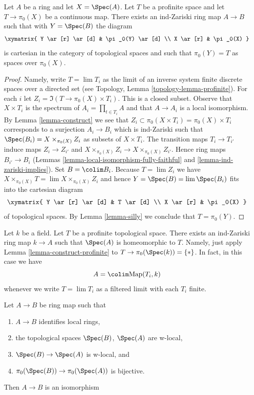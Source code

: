 \begin{lemma}
\label{lemma-construct-profinite}
Let $A$ be a ring and let $X = \Spec(A)$. Let $T$ be a profinite space and
let $T \to \pi_0(X)$ be a continuous map. There exists an
ind-Zariski ring map $A \to B$ such that with $Y = \Spec(B)$ the diagram
$$
\xymatrix{
Y \ar[r] \ar[d] & \pi_0(Y) \ar[d] \\
X \ar[r] & \pi_0(X)
}
$$
is cartesian in the category of topological spaces and such that
$\pi_0(Y) = T$ as spaces over $\pi_0(X)$.
\end{lemma}

\begin{proof}
Namely, write $T = \lim T_i$ as the limit of an inverse system finite
discrete spaces over a directed set (see
Topology, Lemma \ref{topology-lemma-profinite}). For each $i$ let
$Z_i = \Im(T \to \pi_0(X) \times T_i)$. This is a closed subset.
Observe that $X \times T_i$ is the spectrum of $A_i = \prod_{t \in T_i} A$
and that $A \to A_i$ is a local isomorphism. By Lemma \ref{lemma-construct}
we see that $Z_i \subset \pi_0(X \times T_i) = \pi_0(X) \times T_i$
corresponds to a surjection $A_i \to B_i$ which is ind-Zariski
such that $\Spec(B_i) = X \times_{\pi_0(X)} Z_i$ as subsets of
$X \times T_i$. The transition maps $T_i \to T_{i'}$ induce maps
$Z_i \to Z_{i'}$ and $X \times_{\pi_0(X)} Z_i \to X \times_{\pi_0(X)} Z_{i'}$.
Hence ring maps $B_{i'} \to B_i$
(Lemmas \ref{lemma-local-isomorphism-fully-faithful} and
\ref{lemma-ind-zariski-implies}).
Set $B = \colim B_i$. Because $T = \lim Z_i$ we have
$X \times_{\pi_0(X)} T = \lim  X \times_{\pi_0(X)} Z_i$
and hence $Y = \Spec(B) = \lim \Spec(B_i)$
fits into the cartesian diagram
$$
\xymatrix{
Y \ar[r] \ar[d] & T \ar[d] \\
X \ar[r] & \pi_0(X)
}
$$
of topological spaces. By Lemma \ref{lemma-silly}
we conclude that $T = \pi_0(Y)$.
\end{proof}

\begin{example}
\label{example-construct-space}
Let $k$ be a field. Let $T$ be a profinite topological space.
There exists an ind-Zariski ring map $k \to A$ such that
$\Spec(A)$ is homeomorphic to $T$. Namely, just apply
Lemma \ref{lemma-construct-profinite} to $T \to \pi_0(\Spec(k)) = \{*\}$.
In fact, in this case we have
$$
A = \colim \text{Map}(T_i, k)
$$
whenever we write $T = \lim T_i$ as a filtered limit with each $T_i$ finite.
\end{example}

\begin{lemma}
\label{lemma-w-local-morphism-equal-points-stalks-is-iso}
Let $A \to B$ be ring map such that
\begin{enumerate}
\item $A \to B$ identifies local rings,
\item the topological spaces $\Spec(B)$, $\Spec(A)$ are w-local,
\item $\Spec(B) \to \Spec(A)$ is w-local, and
\item $\pi_0(\Spec(B)) \to \pi_0(\Spec(A))$ is bijective.
\end{enumerate}
Then $A \to B$ is an isomorphism
\end{lemma}

